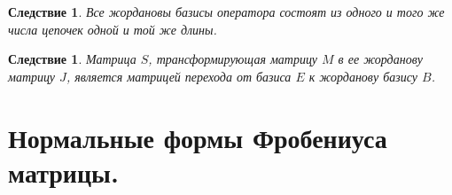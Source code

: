 \newtheorem*{cor12_10_3}{Следствие}\begin{cor12_10_3}Все жордановы базисы оператора состоят из одного и того же числа цепочек одной и той же длины.
\end{cor12_10_3}
\newtheorem*{cor12_10_4}{Следствие}\begin{cor12_10_4}Матрица $S$, трансформирующая матрицу $M$ в ее жорданову матрицу $J$, является матрицей перехода от базиса $E$ к жорданову базису $B$.
\end{cor12_10_4}














\section{Нормальные формы Фробениуса матрицы.}

